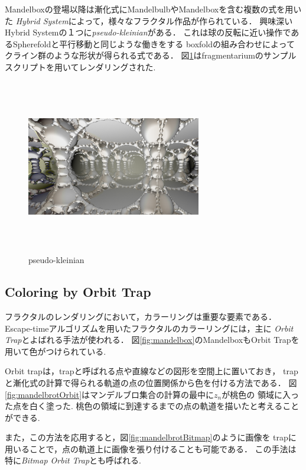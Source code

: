Mandelboxの登場以降は漸化式にMandelbulbやMandelboxを含む複数の式を用いた
{\it Hybrid System}によって，様々なフラクタル作品が作られている．
興味深いHybrid Systemの１つに{\it pseudo-kleinian}がある．
これは球の反転に近い操作であるSpherefoldと平行移動と同じような働きをする
boxfoldの組み合わせによってクライン群のような形状が得られる式である．
図\ref{fig:pseudoKleinian}はfragmentariumのサンプルスクリプトを用いてレンダリングされた.

\begin{figure}[htbp]
  \begin{center}
   \includegraphics[width=3in, height=3in, keepaspectratio]{../img/fractal/pseudoKleinian.pdf}
   \caption{pseudo-kleinian}
   \label{fig:pseudoKleinian}
  \end{center}
\end{figure}


\subsection{Coloring by Orbit Trap}

フラクタルのレンダリングにおいて，カラーリングは重要な要素である．
Escape-timeアルゴリズムを用いたフラクタルのカラーリングには，主に{\it
Orbit Trap}とよばれる手法が使われる．
図\ref{fig:mandelbox}のMandelboxもOrbit Trapを用いて色がつけられている.

Orbit trapは，trapと呼ばれる点や直線などの図形を空間上に置いておき，
trapと漸化式の計算で得られる軌道の点の位置関係から色を付ける方法である．
図\ref{fig:mandelbrotOrbit}はマンデルブロ集合の計算の最中に$z_n$が桃色の
領域に入った点を白く塗った.
桃色の領域に到達するまでの点の軌道を描いたと考えることができる.

また，この方法を応用すると，図\ref{fig:mandelbrotBitmap}のように画像を
trapに用いることで，点の軌道上に画像を張り付けることも可能である．
この手法は特に{\it Bitmap Orbit Trap}とも呼ばれる.

